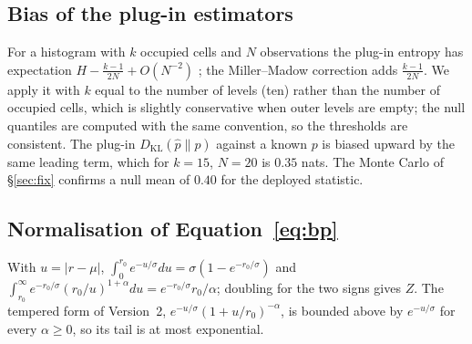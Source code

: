 \documentclass[11pt]{article}
\newcommand{\KL}{D_{\mathrm{KL}}}
\begin{document}
\subsection{Bias of the plug-in estimators}
For a histogram with $k$ occupied cells and $N$ observations the plug-in entropy has expectation $H-\frac{k-1}{2N}+O(N^{-2})$ \citep{miller1955}; the Miller--Madow correction adds $\frac{k-1}{2N}$. We apply it with $k$ equal to the number of levels (ten) rather than the number of occupied cells, which is slightly conservative when outer levels are empty; the null quantiles are computed with the same convention, so the thresholds are consistent. The plug-in $\KL(\hat p\|p)$ against a known $p$ is biased upward by the same leading term, which for $k=15$, $N=20$ is $0.35$ nats. The Monte Carlo of \S\ref{sec:fix} confirms a null mean of $0.40$ for the deployed statistic.
\subsection{Normalisation of Equation~\eqref{eq:bp}}
With $u=|r-\mu|$, $\int_0^{r_0}e^{-u/\sigma}du=\sigma(1-e^{-r_0/\sigma})$ and $\int_{r_0}^\infty e^{-r_0/\sigma}(r_0/u)^{1+\alpha}du=e^{-r_0/\sigma}r_0/\alpha$; doubling for the two signs gives $Z$. The tempered form of Version~2, $e^{-u/\sigma}(1+u/r_0)^{-\alpha}$, is bounded above by $e^{-u/\sigma}$ for every $\alpha\ge0$, so its tail is at most exponential.
\end{document}

